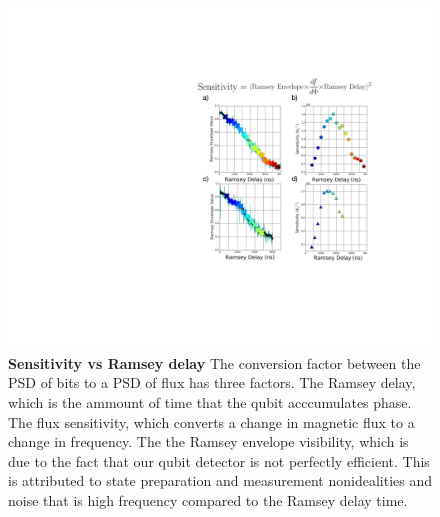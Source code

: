 \begin{figure}[h]
    \begin{center}
        \hspace{-125mm}
    \includegraphics[width=275mm]{./PDF/sensitivity_vs_ramsey_delay_191001_649p.pdf}
    \end{center}
    \caption{\textbf{Sensitivity vs Ramsey delay}
    The conversion factor between the PSD of bits to a PSD of flux has three factors.
    The Ramsey delay, which is the ammount of time that the qubit acccumulates phase.
    The flux sensitivity, which converts a change in magnetic flux to a change in frequency.
    The the Ramsey envelope visibility, which is due to the fact that our qubit detector is not perfectly efficient.
    This is attributed to state preparation and measurement nonidealities and noise that is high frequency compared to the Ramsey delay time.
    }
    \label{SSRTO_sensitivity}
\end{figure}

